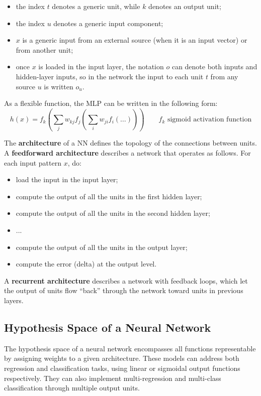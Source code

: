 \begin{itemize}
    \item the index $t$ denotes a generic unit, while $k$ denotes an output unit;

    \item the index $u$ denotes a generic input component;

    \item $x$ is a generic input from an external source (when it is an input vector) or from another unit;

    \item once $x$ is loaded in the input layer, the notation $o$ can denote both inputs and hidden-layer inputs, so in the network the input to each unit $t$ from any source $u$ is written $o_u$.
\end{itemize}
As a flexible function, the MLP can be written in the following form:
\begin{equation}
    h(x) = f_k(\sum_j w_{kj} f_j (\sum_i w_{ji} f_i(\dots)))  \qquad f_k \text{ sigmoid activation function}
\end{equation}

The \textbf{architecture} of a NN defines the topology of the connections between units. A \textbf{feedforward architecture} describes a network that operates as follows. For each input pattern $x$, do:

\begin{itemize}
    \item load the input in the input layer;
    \item compute the output of all the units in the first hidden layer;
    \item compute the output of all the units in the second hidden layer;
    \item ...
    \item compute the output of all the units in the output layer;
    \item compute the error (delta) at the output level.
\end{itemize}
A \textbf{recurrent architecture} describes a network with feedback loops, which let the output of units flow ``back'' through the network toward units in previous layers.

\subsection{Hypothesis Space of a Neural Network}

The hypothesis space of a neural network encompasses all functions representable by assigning weights to a given architecture. These models can address both regression and classification tasks, using linear or sigmoidal output functions respectively. They can also implement multi-regression and multi-class classification through multiple output units.

